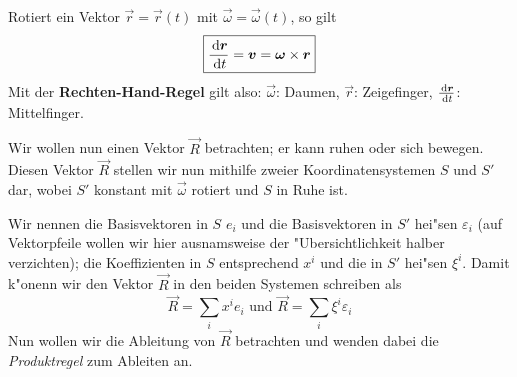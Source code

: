 \begin{Wichtig}
   Rotiert ein Vektor $\Vec r = \vec r(t)$ mit $\Vec \omega = \vec \omega(t)$, so gilt
   \begin{equation}
      \label{eq:425}
      \boxed{
\frac{\diff \Vec r}{\diff t} = \vec v = \Vec \omega \times \Vec r
}
   \end{equation}
Mit der \textbf{Rechten-Hand-Regel} gilt also: $\Vec \omega$: Daumen,
$\Vec r$: Zeigefinger, $\frac{\diff \Vec r}{\diff t}$: Mittelfinger.
\end{Wichtig}



Wir wollen nun einen Vektor $\vec R$ betrachten; er kann ruhen oder
sich bewegen. Diesen Vektor $\vec R$ stellen wir nun mithilfe zweier
Koordinatensystemen $S$ und $S'$ dar, wobei $S'$ konstant mit $\vec
\omega$ rotiert und $S$ in Ruhe ist.

Wir nennen die Basisvektoren in $S$ $e_i$ und die Basisvektoren in
$S'$ hei"sen $\varepsilon_i$ (auf Vektorpfeile wollen wir hier
ausnamsweise der "Ubersichtlichkeit halber verzichten); die
Koeffizienten in $S$ entsprechend $x^i$ und die in $S'$ hei"sen
$\xi^i$. Damit k"onenn wir den Vektor $\vec R$ in den beiden Systemen
schreiben als
\begin{equation*}
   \vec R = \sum_i x^i e_i \text{ und } \vec R = \sum_i \xi^i\varepsilon_i
\end{equation*}
Nun wollen wir die Ableitung von $\vec R$ betrachten und wenden dabei
die \emph{Produktregel} zum Ableiten an.


